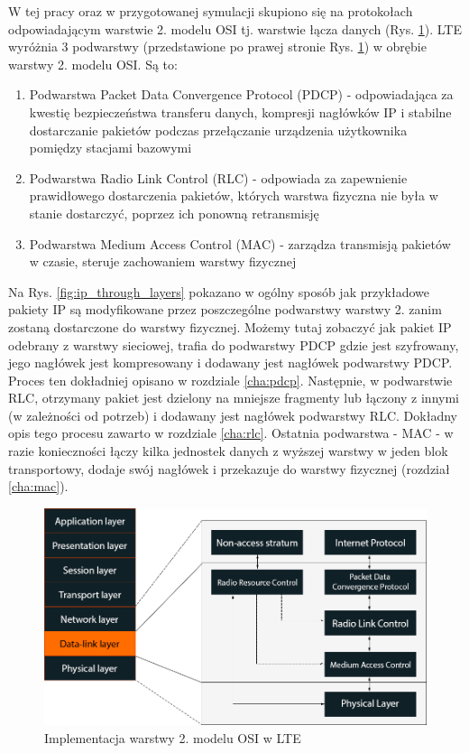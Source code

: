W tej pracy oraz w przygotowanej symulacji skupiono się na protokołach odpowiadającym warstwie 2. modelu OSI tj. warstwie łącza danych (Rys. \ref{fig:osi_to_lte}). LTE wyróżnia 3 podwarstwy (przedstawione po prawej stronie Rys. \ref{fig:osi_to_lte}) w obrębie warstwy 2. modelu OSI. Są to:

\begin{enumerate}
	\item Podwarstwa Packet Data Convergence Protocol (PDCP) - odpowiadająca za kwestię bezpieczeństwa transferu danych, kompresji nagłówków IP i stabilne dostarczanie pakietów podczas przełączanie urządzenia użytkownika pomiędzy stacjami bazowymi
	\item Podwarstwa Radio Link Control (RLC) - odpowiada za zapewnienie prawidłowego dostarczenia pakietów, których warstwa fizyczna nie była w stanie dostarczyć, poprzez ich ponowną retransmisję
	\item Podwarstwa Medium Access Control (MAC) - zarządza transmisją pakietów w czasie, steruje zachowaniem warstwy fizycznej
\end{enumerate}

Na Rys. \ref{fig:ip_through_layers} pokazano w ogólny sposób jak przykładowe pakiety IP są modyfikowane przez poszczególne podwarstwy warstwy 2. zanim zostaną dostarczone do warstwy fizycznej. Możemy tutaj zobaczyć jak pakiet IP odebrany z warstwy sieciowej, trafia do podwarstwy PDCP gdzie jest szyfrowany, jego nagłówek jest kompresowany i dodawany jest nagłówek podwarstwy PDCP. Proces ten dokładniej opisano w rozdziale \ref{cha:pdcp}. Następnie, w podwarstwie RLC, otrzymany pakiet jest dzielony na mniejsze fragmenty lub łączony z innymi (w zależności od potrzeb) i dodawany jest nagłówek podwarstwy RLC. Dokładny opis tego procesu zawarto w rozdziale \ref{cha:rlc}. Ostatnia podwarstwa - MAC - w razie konieczności łączy kilka jednostek danych z wyższej warstwy w jeden blok transportowy, dodaje swój nagłówek i przekazuje do warstwy fizycznej (rozdział \ref{cha:mac}).

\begin{figure}
	\centerline{\includegraphics[width=1.0\textwidth]{images/osi_to_lte.png}}
	\caption{Implementacja warstwy 2. modelu OSI w LTE}
	\label{fig:osi_to_lte}
\end{figure}

